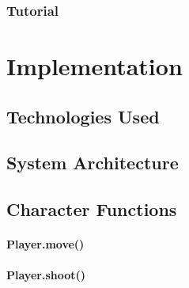 \documentclass[a4paper,11.5pt]{report}
\numberwithin{figure}{section}
\numberwithin{table}{section}
\numberwithin{equation}{section}
\numberwithin{equation}{section}
\newcommand\blankpage{%
    \null
    \thispagestyle{empty}%
    \addtocounter{page}{-1}%
    \newpage}
\begin{document}
\subsection{Tutorial}




\afterpage{\blankpage}


\chapter{Implementation}


\section{Technologies Used}

\section{System Architecture}

\section{Character Functions}

\subsubsection*{Player.move()}

\subsubsection*{Player.shoot()}
\end{document}
